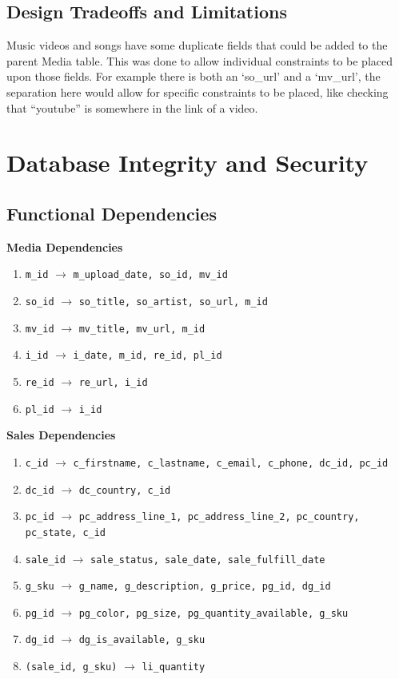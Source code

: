 \documentclass[11pt, a4paper]{report}
\begin{document}
\clearpage
\section{Design Tradeoffs and Limitations}
Music videos and songs have some duplicate fields that could be added to the parent Media table. This was done to allow individual constraints to be placed upon those fields. For example there is both an `so\_url' and a `mv\_url', the separation here would allow for specific constraints to be placed, like checking that ``youtube'' is somewhere in the link of a video.

\chapter{Database Integrity and Security}

\section{Functional Dependencies}

\noindent\textbf{Media Dependencies}
\begin{enumerate}
\item \texttt{m\_id} $\longrightarrow$ \texttt{m\_upload\_date, so\_id, mv\_id}
\item \texttt{so\_id} $\longrightarrow$ \texttt{so\_title, so\_artist, so\_url, m\_id}
\item \texttt{mv\_id} $\longrightarrow$ \texttt{mv\_title, mv\_url, m\_id}
\item \texttt{i\_id} $\longrightarrow$ \texttt{i\_date, m\_id, re\_id, pl\_id}
\item \texttt{re\_id} $\longrightarrow$ \texttt{re\_url, i\_id}
\item \texttt{pl\_id} $\longrightarrow$ \texttt{i\_id}
\end{enumerate}

\noindent\textbf{Sales Dependencies}
\begin{enumerate}
\item \texttt{c\_id} $\longrightarrow$ \texttt{c\_firstname, c\_lastname, c\_email, c\_phone, dc\_id, pc\_id}
\item \texttt{dc\_id} $\longrightarrow$ \texttt{dc\_country, c\_id}
\item \texttt{pc\_id} $\longrightarrow$ \texttt{pc\_address\_line\_1, pc\_address\_line\_2, pc\_country, pc\_state, c\_id}
\item \texttt{sale\_id} $\longrightarrow$ \texttt{sale\_status, sale\_date, sale\_fulfill\_date}
\item \texttt{g\_sku} $\longrightarrow$ \texttt{g\_name, g\_description, g\_price, pg\_id, dg\_id}
\item \texttt{pg\_id} $\longrightarrow$ \texttt{pg\_color, pg\_size, pg\_quantity\_available, g\_sku}
\item \texttt{dg\_id} $\longrightarrow$ \texttt{dg\_is\_available, g\_sku}
\item \texttt{(sale\_id, g\_sku)} $\longrightarrow$ \texttt{li\_quantity}
\end{enumerate}
\end{document}
